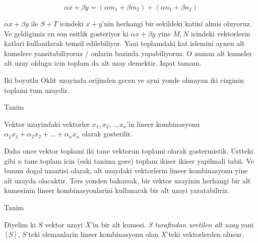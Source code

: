 \documentclass[12pt,fleqn]{article}
\begin{document}
\[ \alpha x + \beta y  = (\alpha m_1 + \beta m_2) + (\alpha n_1  + \beta n_2 )\]

$\alpha x + \beta y $ ile $S+T$ icindeki $x+y$'nin herhangi bir sekildeki
katini almis oluyoruz. Ve geldigimiz en son esitlik gosteriyor 
ki $\alpha x
+ \beta y$ yine $M,N$ icindeki vektorlerin katlari kullanilarak 
temsil edilebiliyor. Yani toplamdaki kat islemini aynen alt kumelere
yansitabiliyoruz / onlarin bazinda yapabiliyoruz. O zaman alt kumeler alt
uzay oldugu icin toplam da alt uzay demektir. Ispat tamam.

Iki boyutlu Oklit uzayinda orijinden gecen ve ayni yonde olmayan iki cizginin
toplami tum uzaydir. 

Tanim

Vektor uzayindaki vektorler $x_1,x_2,..,x_n$'in lineer kombinasyonu
$\alpha_1 x_1 + \alpha_2 x_2 + ... + \alpha_n x_n$ olarak gosterilir. 

Daha once vektor toplami iki tane vektorun toplami olarak
gostermistik. Ustteki gibi $n$ tane toplam icin (eski tanima gore) toplam
ikiser ikiser yapilmali tabii. Ve bunun dogal uzantisi olarak, alt
uzaydaki vektorlerin lineer kombinasyonu yine alt uzayda olacaktir. Ters
yonden bakarsak, bir vektor uzayinin herhangi bir alt kumesinin lineer
kombinasyonlarini kullanarak bir alt uzayi yaratabiliriz. 

Tanim

Diyelim ki $S$ vektor uzayi $X$'in bir alt kumesi. {\em S tarafindan
  uretilen alt uzay} yani $[S]$, $S$'teki elemanlarin lineer
kombinasyonu olan $X$'teki vektorlerden olusur. 
\end{document}
